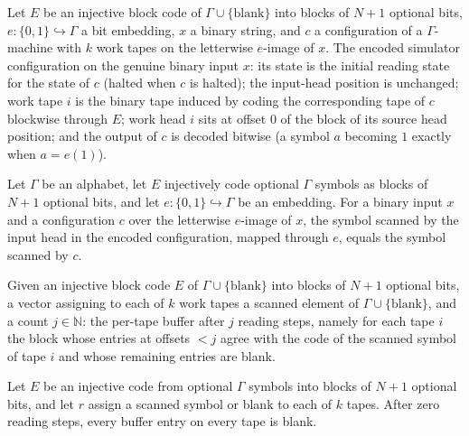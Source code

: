 \begin{definition}
\label{Turing.FinTM.arCfg}
\leanok
{}
Let $E$ be an injective block code of $\Gamma \cup \{\text{blank}\}$ into blocks of
$N+1$ optional bits, $e : \{0,1\} \hookrightarrow \Gamma$ a bit embedding, $x$ a binary
string, and $c$ a configuration of a $\Gamma$-machine with $k$ work tapes on the
letterwise $e$-image of $x$. The encoded simulator configuration on the genuine binary
input $x$: its state is the initial reading state for the state of $c$ (halted when $c$
is halted); the input-head position is unchanged; work tape $i$ is the binary tape
induced by coding the corresponding tape of $c$ blockwise through $E$; work head $i$
sits at offset $0$ of the block of its source head position; and the output of $c$ is
decoded bitwise (a symbol $a$ becoming $1$ exactly when $a = e(1)$).
\end{definition}

\begin{lemma}
\label{Turing.FinTM.arCfg_input}
\leanok
{}
Let $\Gamma$ be an alphabet, let $E$ injectively code optional $\Gamma$ symbols
as blocks of $N+1$ optional bits, and let $e:\{0,1\}\hookrightarrow\Gamma$ be an
embedding. For a binary input $x$ and a configuration $c$ over the letterwise $e$-image
of $x$, the symbol scanned by the input head in the encoded configuration, mapped
through $e$, equals the symbol scanned by $c$.
\end{lemma}

\begin{definition}
\label{Turing.FinTM.arBuffer}
\leanok
{}
Given an injective block code $E$ of $\Gamma \cup \{\text{blank}\}$ into blocks of
$N+1$ optional bits, a vector assigning to each of $k$ work tapes a scanned element of
$\Gamma \cup \{\text{blank}\}$, and a count $j \in \mathbb{N}$: the per-tape buffer
after $j$ reading steps, namely for each tape $i$ the block whose entries at offsets
$< j$ agree with the code of the scanned symbol of tape $i$ and whose remaining entries
are blank.
\end{definition}

\begin{lemma}
\label{Turing.FinTM.arBuffer_zero}
\leanok
{}
Let $E$ be an injective code from optional $\Gamma$ symbols into blocks of $N+1$
optional bits, and let $r$ assign a scanned symbol or blank to each of $k$ tapes. After
zero reading steps, every buffer entry on every tape is blank.
\end{lemma}

